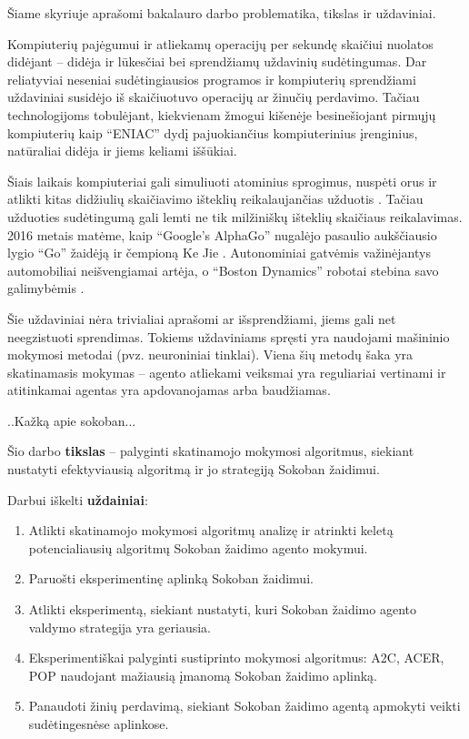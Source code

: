 \documentclass{VUMIFPSbakalaurinis}
\begin{document}
\label{sec:ivadas}
{
	Šiame skyriuje aprašomi bakalauro darbo problematika, tikslas ir uždaviniai.
}
\label{subsec:problematika}
{
	Kompiuterių pajėgumui ir atliekamų operacijų per sekundę skaičiui nuolatos didėjant -- didėja ir lūkesčiai bei sprendžiamų uždavinių sudėtingumas. Dar reliatyviai neseniai sudėtingiausios programos ir kompiuterių sprendžiami uždaviniai susidėjo iš skaičiuotuvo operacijų ar žinučių perdavimo. Tačiau technologijoms tobulėjant, kiekvienam žmogui kišenėje besinešiojant pirmųjų kompiuterių kaip \enquote{ENIAC} \cite{computer_history} dydį pajuokiančius kompiuterinius įrenginius, natūraliai didėja ir jiems keliami iššūkiai.\par
	
	Šiais laikais kompiuteriai gali simuliuoti atominius sprogimus, nuspėti orus ir atlikti kitas didžiulių skaičiavimo išteklių reikalaujančias užduotis \cite{supercomputers}. Tačiau užduoties sudėtingumą gali lemti ne tik milžiniškų išteklių skaičiaus reikalavimas. 2016 metais matėme, kaip \enquote{Google’s AlphaGo} nugalėjo pasaulio aukščiausio lygio \enquote{Go} žaidėją ir čempioną Ke Jie \cite{go}. Autonominiai gatvėmis važinėjantys automobiliai neišvengiamai artėja, o \enquote{Boston Dynamics} robotai stebina savo galimybėmis \cite{bostondynamics}.\par
	
	Šie uždaviniai nėra trivialiai aprašomi ar išsprendžiami, jiems gali net neegzistuoti sprendimas. Tokiems uždaviniams spręsti yra naudojami mašininio mokymosi metodai (pvz. neuroniniai tinklai). Viena šių metodų šaka yra skatinamasis mokymas -- agento atliekami veiksmai yra reguliariai vertinami ir atitinkamai agentas yra apdovanojamas arba baudžiamas.
	
	..Kažką apie sokoban...
}
\label{subsec:tikslas}
{
	Šio darbo \textbf{tikslas} -- palyginti skatinamojo mokymosi algoritmus, siekiant nustatyti efektyviausią algoritmą ir jo strategiją Sokoban žaidimui.
}
\label{subsec:uzdaviniai}
{
	Darbui iškelti \textbf{uždainiai}:
	\begin{enumerate}
		\item Atlikti skatinamojo mokymosi algoritmų analizę ir atrinkti keletą potencialiausių algoritmų Sokoban žaidimo agento mokymui.
		\item Paruošti eksperimentinę aplinką Sokoban žaidimui.
		\item Atlikti eksperimentą, siekiant nustatyti, kuri Sokoban žaidimo agento valdymo strategija yra geriausia.
		\item Eksperimentiškai palyginti sustiprinto mokymosi algoritmus: A2C, ACER, POP naudojant mažiausią įmanomą Sokoban žaidimo aplinką.
		\item Panaudoti žinių perdavimą, siekiant Sokoban žaidimo agentą apmokyti veikti sudėtingesnėse aplinkose.
	\end{enumerate}
}
\end{document}
